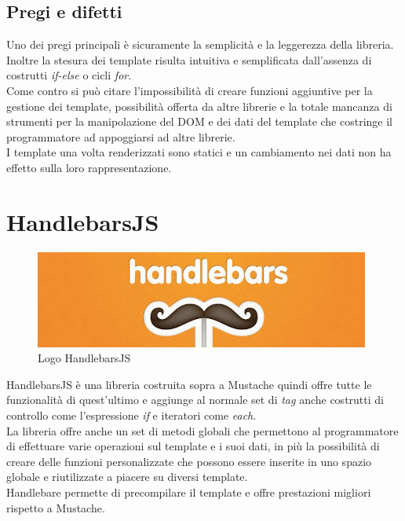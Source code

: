 \subsection{Pregi e difetti}
Uno dei pregi principali è sicuramente la semplicità e la leggerezza della libreria.\\
Inoltre la stesura dei template risulta intuitiva e semplificata dall'assenza di costrutti \textit{if-else} o cicli \textit{for}.\\
Come contro si può citare l'impossibilità di creare funzioni aggiuntive per la gestione dei template, possibilità offerta da altre librerie e la totale mancanza di strumenti per la manipolazione del DOM e dei dati del template che costringe il programmatore ad appoggiarsi ad altre librerie.\\
I template una volta renderizzati sono statici e un cambiamento nei dati non ha effetto sulla loro rappresentazione.

\FloatBarrier
\section{HandlebarsJS}

\begin{figure}[htp]
	\centering
	\includegraphics[width=\textwidth/2]{../immagini/handlebars_logo}
	\caption{Logo  HandlebarsJS}
\end{figure}

HandlebarsJS è una libreria costruita sopra a Mustache quindi offre tutte le funzionalità di quest'ultimo e aggiunge al normale set di \textit{tag} anche costrutti di controllo come l'espressione \textit{if} e iteratori come \textit{each}.\\
La libreria offre anche un set di metodi globali che permettono al programmatore di effettuare varie operazioni sul template e i suoi dati, in più la possibilità di creare delle funzioni personalizzate che possono essere inserite in uno spazio globale e riutilizzate a piacere su diversi template.\\
Handlebare permette di precompilare il template e offre prestazioni migliori rispetto a Mustache.
